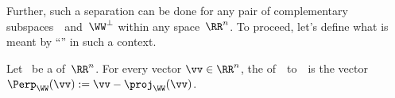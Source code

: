 Further, such a separation can be done for any pair of complementary subspaces~\WW\ and~\(\WW^\perp\) within any space~\(\RR^n\).
To proceed, let's define what is meant by ``\Perp'' in such a context.


\begin{definition} \label{def:perpn}
Let \WW\ be a  of~\(\RR^n\).
For every vector \(\vv\in\RR^n\), the  of~\vv\  to~\WW\ is the vector
\(\Perp_\WW(\vv):=\vv-\proj_{\WW}(\vv)\).
\end{definition}




